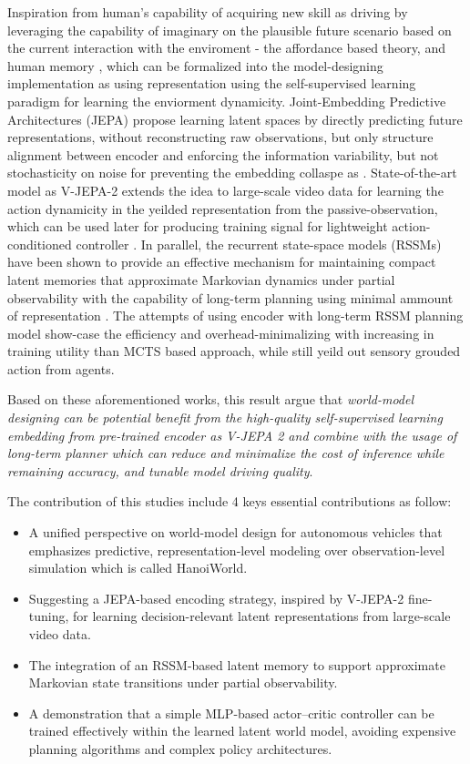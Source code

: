 Inspiration from human's capability of acquiring new skill as driving by leveraging the capability of imaginary on the plausible future scenario based on the current interaction with the enviroment - the affordance based theory, and human memory \cite{ha_2018_world, gibson_1979_the, LeCun2022}, which can be formalized into the model-designing implementation as using representation using the self-supervised learning paradigm for learning the enviorment dynamicity. Joint-Embedding Predictive Architectures (JEPA) propose learning latent spaces by directly predicting future representations, without reconstructing raw observations, but only structure alignment between encoder and enforcing the information variability, but not stochasticity on noise for preventing the embedding collaspe as \cite{bardes_2022_vicreg}. State-of-the-art model as V-JEPA-2 extends the idea to large-scale video data for learning the action dynamicity in the yeilded representation from the passive-observation, which can be used later for producing training signal for lightweight action-conditioned controller \cite{Assran2025}. In parallel, the  recurrent state-space models (RSSMs) have been shown to provide an effective mechanism for maintaining compact latent memories that approximate Markovian dynamics under partial observability with the capability of long-term planning using minimal ammount of representation \cite{hafner_2019_learning, Hafner2023}. The attempts of using encoder with long-term RSSM planning model show-case the efficiency and overhead-minimalizing with increasing in training utility than MCTS based approach, while still yeild out sensory grouded action from agents.

Based on these aforementioned works, this result argue that \textit{world-model designing can be potential benefit from the high-quality self-supervised learning embedding from pre-trained encoder as V-JEPA 2 and combine with the usage of long-term planner which can reduce and minimalize the cost of inference while remaining accuracy, and tunable model driving quality}.

The contribution of this studies include 4 keys essential contributions as follow:

\begin{itemize}
    \item A unified perspective on world-model design for autonomous vehicles that emphasizes predictive, representation-level modeling over observation-level simulation which is called HanoiWorld.
    \item Suggesting a JEPA-based encoding strategy, inspired by V-JEPA-2 fine-tuning, for learning decision-relevant latent representations from large-scale video data.
    \item The integration of an RSSM-based latent memory to support approximate Markovian state transitions under partial observability.
    \item A demonstration that a simple MLP-based actor--critic controller can be trained effectively within the learned latent world model, avoiding expensive planning algorithms and complex policy architectures.
\end{itemize}

